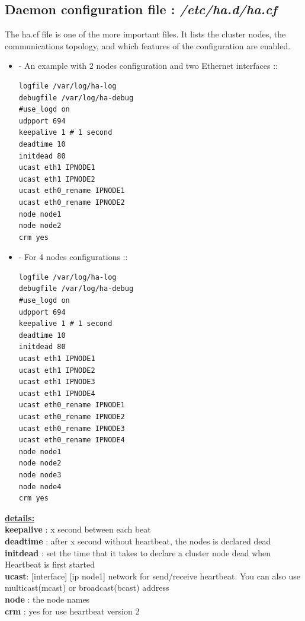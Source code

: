 \documentclass[a4paper,10pt]{report}
\begin{document}
\subsection{Daemon configuration file : \textit{/etc/ha.d/ha.cf}}

The ha.cf file is one of the more important files. It lists the cluster nodes, the communications topology, and which features of the configuration are enabled. 
\begin{itemize}
\item - An example with 2 nodes configuration and two Ethernet interfaces ::
\begin{lstlisting}
logfile /var/log/ha-log
debugfile /var/log/ha-debug
#use_logd on
udpport 694
keepalive 1 # 1 second
deadtime 10
initdead 80
ucast eth1 IPNODE1
ucast eth1 IPNODE2
ucast eth0_rename IPNODE1
ucast eth0_rename IPNODE2
node node1
node node2
crm yes
\end{lstlisting}

\item - For 4 nodes configurations ::
\begin{lstlisting}
logfile /var/log/ha-log
debugfile /var/log/ha-debug
#use_logd on
udpport 694
keepalive 1 # 1 second
deadtime 10
initdead 80
ucast eth1 IPNODE1
ucast eth1 IPNODE2
ucast eth1 IPNODE3
ucast eth1 IPNODE4
ucast eth0_rename IPNODE1
ucast eth0_rename IPNODE2
ucast eth0_rename IPNODE3
ucast eth0_rename IPNODE4
node node1
node node2
node node3
node node4
crm yes
\end{lstlisting}
\end{itemize}

\textbf{\underline{details:}}\\
\textbf{keepalive} : x second between each beat\\
\textbf{deadtime} : after x second without heartbeat, the nodes is declared dead\\
\textbf{initdead} : set the time that it takes to declare a cluster node dead when Heartbeat is first started\\
\textbf{ucast}: [interface] [ip node1] network for send/receive heartbeat. You can also use multicast(mcast) or broadcast(bcast) address\\
\textbf{node} : the node names\\
\textbf{crm} : yes for use heartbeat version 2\\
\end{document}
